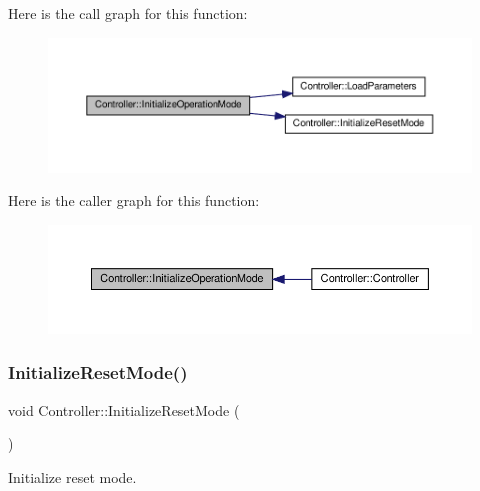 Here is the call graph for this function\+:
\nopagebreak
\begin{figure}[H]
\begin{center}
\leavevmode
\includegraphics[width=350pt]{classController_a4f8fff93f7443154b80cd2d18316e32d_cgraph}
\end{center}
\end{figure}
Here is the caller graph for this function\+:
\nopagebreak
\begin{figure}[H]
\begin{center}
\leavevmode
\includegraphics[width=350pt]{classController_a4f8fff93f7443154b80cd2d18316e32d_icgraph}
\end{center}
\end{figure}
\mbox{\label{classController_a97450864deedc5aaba0380b52a716292}} 
\subsubsection{\texorpdfstring{Initialize\+Reset\+Mode()}{InitializeResetMode()}}
{\footnotesize\ttfamily void Controller\+::\+Initialize\+Reset\+Mode (\begin{DoxyParamCaption}{ }\end{DoxyParamCaption})\hspace{0.3cm}{\ttfamily [private]}}



Initialize reset mode. 


